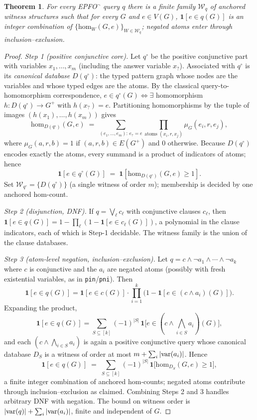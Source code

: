 \documentclass[journal]{IEEEtran}
\newtheorem{theorem*}{Theorem}
\newcommand{\homc}{\mathrm{hom}}
\begin{document}
\begin{theorem*}
For every EPFO$^\neg$ query $q$ there is a finite family $\mathcal W_q$ of
anchored witness structures such that for every $G$ and $e\in V(G)$,
$\mathbf 1[e\in q(G)]$ is an integer combination of
$\{\homc_W(G,e)\}_{W\in\mathcal W_q}$; negated atoms enter through
inclusion--exclusion.
\end{theorem*}
\begin{proof}
\emph{Step 1 (positive conjunctive core).} Let $q^\circ$ be the
positive conjunctive part with variables $x_1,\dots,x_m$ (including the
answer variable $x_?$). Associated with $q^\circ$ is its \emph{canonical
database} $D(q^\circ)$: the typed pattern graph whose nodes are the
variables and whose typed edges are the atoms. By the classical
query-to-homomorphism correspondence,
$e\in q^\circ(G)\iff\exists$ homomorphism $h:D(q^\circ)\to G^{+}$ with
$h(x_?)=e$. Partitioning homomorphisms by the tuple of images
$(h(x_1),\dots,h(x_m))$ gives
\[
\homc_{D(q^\circ)}(G,e) \;=\; \sum_{(e_1,\dots,e_m):\,e_{?}=e}
\prod_{\text{atoms }(x_i,r,x_j)} \mu_G(e_i,r,e_j),
\]
where $\mu_G(a,r,b)=1$ if $(a,r,b)\in E(G^{+})$ and $0$ otherwise. Because
$D(q^\circ)$ encodes exactly the atoms, every summand is a product of
indicators of atoms; hence
\[
\mathbf 1[e\in q^\circ(G)] \;=\; \mathbf 1\!\left[\homc_{D(q^\circ)}(G,e) \ge 1\right].
\]
Set $\mathcal W_{q^\circ}=\{D(q^\circ)\}$ (a single witness of order
$m$); membership is decided by one anchored hom-count.

\emph{Step 2 (disjunction, DNF).} If $q = \bigvee_{\ell} c_\ell$ with
conjunctive clauses $c_\ell$, then
$\mathbf 1[e\in q(G)] = 1-\prod_\ell(1-\mathbf 1[e\in c_\ell(G)])$, a
polynomial in the clause indicators, each of which is Step-1 decidable.
The witness family is the union of the clause databases.

\emph{Step 3 (atom-level negation, inclusion--exclusion).} Let
$q = c \wedge \neg a_1 \wedge \cdots \wedge \neg a_k$ where $c$ is
conjunctive and the $a_i$ are negated atoms (possibly with fresh
existential variables, as in \texttt{pin}/\texttt{pni}). Then
\[
\mathbf 1[e\in q(G)] = \mathbf 1[e\in c(G)]\cdot
\prod_{i=1}^{k}\bigl(1-\mathbf 1[e\in (c\wedge a_i)(G)]\bigr).
\]
Expanding the product,
\[
\mathbf 1[e\in q(G)] = \sum_{S\subseteq[k]} (-1)^{|S|}\,
\mathbf 1\bigl[e\in (c\wedge\bigwedge_{i\in S}a_i)(G)\bigr],
\]
and each $(c\wedge\bigwedge_{i\in S}a_i)$ is again a positive conjunctive
query whose canonical database $D_S$ is a witness of order at most
$m+\sum_{i}|{\rm var}(a_i)|$. Hence
\[
\mathbf 1[e\in q(G)] \;=\; \sum_{S\subseteq[k]}(-1)^{|S|}\,
\mathbf 1\bigl[\homc_{D_S}(G,e)\ge 1\bigr],
\]
a finite integer combination of anchored hom-counts; negated atoms
contribute through inclusion--exclusion as claimed. Combining Steps 2 and
3 handles arbitrary DNF with negation. The bound on witness order is
$|{\rm var}(q)|+\sum_i |{\rm var}(a_i)|$, finite and independent of $G$.
\end{proof}
\end{document}
